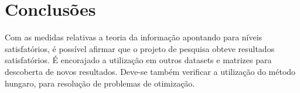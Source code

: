\documentclass{article}
\begin{document}
        \newpage

    \section{Conclusões}

        Com as medidas relativas a teoria da informação apontando para níveis satisfatórios, é possível afirmar que o projeto de pesquisa obteve resultados satisfatórios.
        É encorajado a utilização em outros datasets e matrizes para descoberta de novos resultados.
        Deve-se também verificar a utilização do método hungaro, para resolução de problemas de otimização.

    
    
\end{document}
